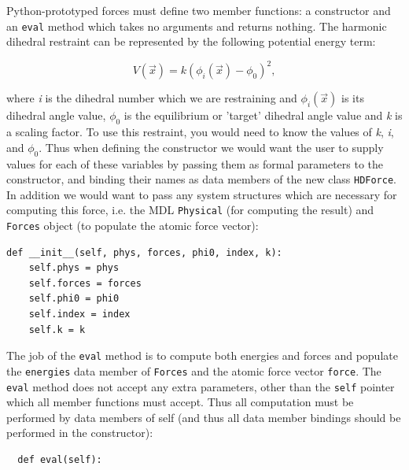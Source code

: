 \documentclass[11pt]{report}
\begin{document}
Python-prototyped forces must define two member functions: a constructor
and an \texttt{eval} method which takes no arguments and returns
nothing.  The harmonic dihedral restraint can be represented by
the following potential energy term:

\begin{equation}
V(\vec x) = k (\phi_{i}(\vec x) - \phi_{0}) ^ {2},
\label{eqn:harmd}
\end{equation}

where {\it i} is the dihedral number which we are restraining and 
\begin{math} \phi_{i}(\vec x) \end{math} is its dihedral angle value,
\begin{math} \phi_{0} \end{math} is the equilibrium or 'target'
dihedral angle value and {\it k} is a scaling factor.  To use this
restraint, you would need to know the values of {\it k}, {\it i}, and
\begin{math} \phi_{0} \end{math}.  Thus when defining the constructor
we would want the user to supply values for each of these variables
by passing them as formal parameters to the constructor, and binding their
names as data members of the new class \texttt{HDForce}.  In addition
we would want to pass any system structures which are necessary for
computing this force, i.e. the MDL \texttt{Physical} (for computing
the result) and \texttt{Forces} object (to populate the atomic force
vector):

\begin{verbatim}
def __init__(self, phys, forces, phi0, index, k):
    self.phys = phys
    self.forces = forces
    self.phi0 = phi0
    self.index = index
    self.k = k
\end{verbatim}

The job of the \texttt{eval} method is to compute both
energies and forces and populate the \texttt{energies} data 
member of \texttt{Forces} and the atomic force vector \texttt{force}.
The \texttt{eval} method does not accept any extra parameters,
other than the \texttt{self} pointer which all member functions
must accept.  Thus all computation must be performed by data
members of self (and thus all data member bindings should be performed
in the constructor):

\begin{verbatim}
  def eval(self):
\end{verbatim}
\end{document}
